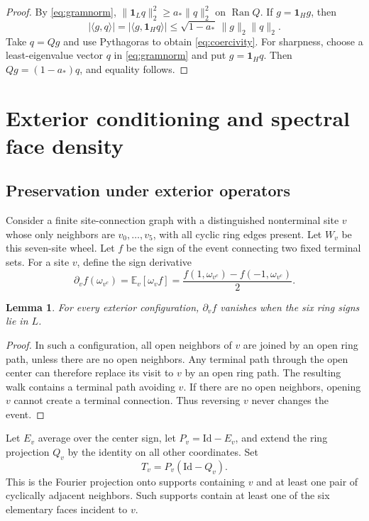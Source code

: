 \documentclass[11pt]{amsart}
\newtheorem{lemma}[theorem]{Lemma}
\theoremstyle{remark}
\newcommand{\E}{\mathbb E}
\newcommand{\one}{\mathbf 1}
\newcommand{\Id}{\mathrm{Id}}
\newcommand{\astar}{a_*}
\begin{document}
\begin{proof}
By \eqref{eq:gramnorm}, $\|\one_Lq\|_2^2\ge\astar\|q\|_2^2$ on $\operatorname{Ran}Q$. If $g=\one_Hg$, then
\[
 |\langle g,q\rangle|=|\langle g,\one_Hq\rangle|
 \le\sqrt{1-\astar}\,\|g\|_2\|q\|_2.
\]
Take $q=Qg$ and use Pythagoras to obtain \eqref{eq:coercivity}. For sharpness, choose a least-eigenvalue vector $q$ in \eqref{eq:gramnorm} and put $g=\one_Hq$. Then $Qg=(1-\astar)q$, and equality follows.
\end{proof}

\section{Exterior conditioning and spectral face density}\label{sec:faces}
\subsection{Preservation under exterior operators}\label{sec:conditioning}

Consider a finite site-connection graph with a distinguished nonterminal site $v$ whose only neighbors are $v_0,\ldots,v_5$, with all cyclic ring edges present. Let $W_v$ be this seven-site wheel. Let $f$ be the sign of the event connecting two fixed terminal sets. For a site $v$, define the sign derivative
\[
 \partial_v f(\omega_{v^c})
 =\E_v[\omega_vf]
 =\frac{f(1,\omega_{v^c})-f(-1,\omega_{v^c})}{2}.
\]

\begin{lemma}\label{lem:zero}
For every exterior configuration, $\partial_vf$ vanishes when the six ring signs lie in $L$.
\end{lemma}
\begin{proof}
In such a configuration, all open neighbors of $v$ are joined by an open ring path, unless there are no open neighbors. Any terminal path through the open center can therefore replace its visit to $v$ by an open ring path. The resulting walk contains a terminal path avoiding $v$. If there are no open neighbors, opening $v$ cannot create a terminal connection. Thus reversing $v$ never changes the event.
\end{proof}

Let $E_v$ average over the center sign, let $P_v=\Id-E_v$, and extend the ring projection $Q_v$ by the identity on all other coordinates. Set
\[
 T_v=P_v(\Id-Q_v).
\]
This is the Fourier projection onto supports containing $v$ and at least one pair of cyclically adjacent neighbors. Such supports contain at least one of the six elementary faces incident to $v$.
\end{document}
